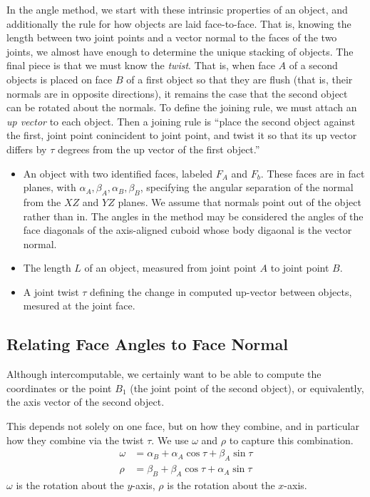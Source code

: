 \documentclass[11pt]{article}
\begin{document}
In the angle method, we start with these intrinsic properties of an object, and additionally the
rule for how objects are laid face-to-face. That is, knowing the length between two
joint points and a vector normal to the faces of the two joints, we almost have
enough to determine the unique stacking of objects. The final piece is that we must
know the {\em twist}. That is, when face $A$ of a second objects is placed on face $B$
of a first object so that they are flush (that is, their normals are in opposite directions),
it remains the case that the second object can be rotated about the normals. To
define the joining rule, we must attach an {\em up vector} to each object. Then a joining
rule is ``place the second object against the first, joint point conincident to joint point,
and twist it so that its up vector differs by $\tau$ degrees from the up vector of the first
object.''

\begin{itemize}
\item An object with two identified faces, labeled $F_A$ and $F_b$. These faces are in
  fact planes, with $\alpha_A, \beta_A, \alpha_B, \beta_B$, specifying the
  angular separation of the normal from the $XZ$ and $YZ$ planes. We assume that normals point out
  of the object rather than in. The angles in the method may be considered the angles of the face diagonals of the axis-aligned cuboid whose body digaonal is the vector normal.
\item The length $L$ of an object, measured from joint point $A$ to joint point $B$.
\item A joint twist $\tau$ defining the change in computed up-vector between objects,
  mesured at the joint face.
\end{itemize}


\subsection{Relating Face Angles to Face Normal}

Although intercomputable, we certainly want to be able to compute
the coordinates or the point $B_1$ (the joint point of the second object),
or equivalently, the axis vector of the second object.

This depends not solely on one face, but on how they combine, and in
particular how they combine via the twist $\tau$. We use $\omega$ and $\rho$
to capture this combination.
\begin{align}
  \omega &= \alpha_B + \alpha_A \cos{\tau} + \beta_A \sin{\tau} \\
  \rho &= \beta_B + \beta_A \cos{\tau}  + \alpha_A \sin{\tau}
\end{align}
$\omega$ is the rotation about the $y$-axis,
$\rho$ is the rotation about the $x$-axis.
\end{document}
